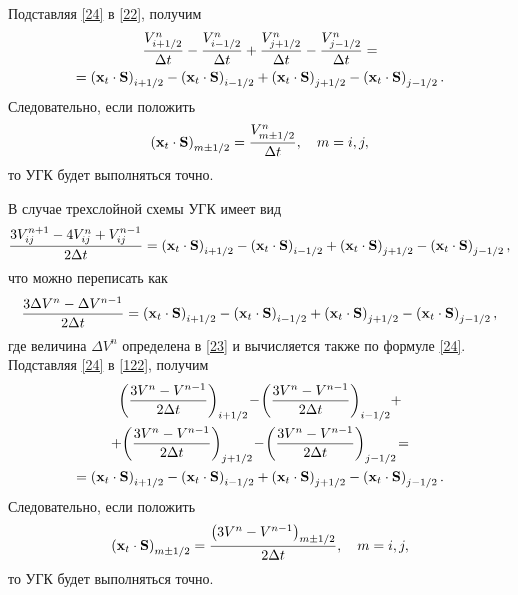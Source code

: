 Подставляя \eqref{24} в \eqref{22}, получим 
\begin{gather}
  \label{26}
  \frac{V^n_{i + 1/2}}{\Delta t} -  \frac{V^n_{i - 1/2}}{\Delta t} +  \frac{V^n_{j + 1/2}}{\Delta t}- 
  \frac{V^n_{j - 1/2}}{\Delta t} =\notag\\ = 
  \left( {{\bf{x}}_t  \cdot {\bf{S}}} \right)_{i + 1/2}  - \left( {{\bf{x}}_t  \cdot {\bf{S}}} 
  \right)_{i - 1/2}  + \left( {{\bf{x}}_t  \cdot {\bf{S}}} \right)_{j + 1/2}  - \left( {{\bf{x}}_t  
  \cdot {\bf{S}}} \right)_{j - 1/2}.
\end{gather}
Следовательно, если положить
\begin{equation}
  \label{27}
  \left( {{\bf{x}}_t  \cdot {\bf{S}}} \right)_{m \pm 1/2} = 
  \frac{{V^n_{m \pm 1/2}}}{{\Delta t}},\quad m = i,j,
\end{equation}
то УГК будет выполняться точно.

В случае трехслойной схемы УГК имеет вид
\begin{equation}
  \label{121} 
  \frac{{3V_{ij}^{n + 1}  - 4V_{ij}^n  + V_{ij}^{n - 1} }}{{2\Delta t}} = \left( {{\bf{x}}_t  \cdot {\bf{S}}}
  \right)_{i + 1/2}  - \left( {{\bf{x}}_t  \cdot {\bf{S}}} \right)_{i - 1/2} +
  \left( {{\bf{x}}_t  \cdot {\bf{S}}} \right)_{j + 1/2} - 
  \left( {{\bf{x}}_t  \cdot {\bf{S}}} \right)_{j - 1/2},
\end{equation}
что можно переписать как
\begin{equation}
  \label{122} 
  \frac{{3\Delta V_{}^n - \Delta V_{}^{n - 1} }}{{2\Delta t}}= \left( {{\bf{x}}_t  \cdot {\bf{S}}} 
  \right)_{i + 1/2}  - \left( {{\bf{x}}_t  \cdot {\bf{S}}} \right)_{i - 1/2} +
  \left( {{\bf{x}}_t  \cdot {\bf{S}}} \right)_{j + 1/2} - 
  \left( {{\bf{x}}_t  \cdot {\bf{S}}} \right)_{j - 1/2} ,
\end{equation}
где величина $\Delta V_{}^n$ определена в \eqref{23} и вычисляется также по формуле \eqref{24}.
Подставляя \eqref{24} в \eqref{122}, получим
\begin{gather}
  \left(\frac{3V^n  - V^{n - 1}}{2\Delta t}\right)_{i + 1/2}\! - \! 
  \left(\frac{3V^n  - V^{n - 1}}{2\Delta t}\right)_{i - 1/2}\! + \notag\\ +\! 
  \left(\frac{3V^n  - V^{n - 1}}{2\Delta t}\right)_{j + 1/2}\! -\! 
  \left(\frac{3V^n  - V^{n - 1}}{2\Delta t}\right)_{j - 1/2}\! =\notag\\ = 
  \left( {{\bf{x}}_t  \cdot {\bf{S}}} \right)_{i + 1/2}  - 
  \left( {{\bf{x}}_t  \cdot {\bf{S}}} \right)_{i - 1/2}  + 
  \left( {{\bf{x}}_t  \cdot {\bf{S}}} \right)_{j + 1/2}  - 
  \left( {{\bf{x}}_t  \cdot {\bf{S}}} \right)_{j - 1/2}.
  \label{126}
\end{gather}
Следовательно, если положить
\begin{equation}
 \label{127}
 \left( {{\bf{x}}_t  \cdot {\bf{S}}} \right)_{m \pm 1/2} = 
 \frac{{{\left(3V^n - V^{n - 1}\right)}_{m \pm 1/2}}}{{2\Delta t}},\quad m = i,j,
\end{equation}
то УГК будет выполняться точно.

